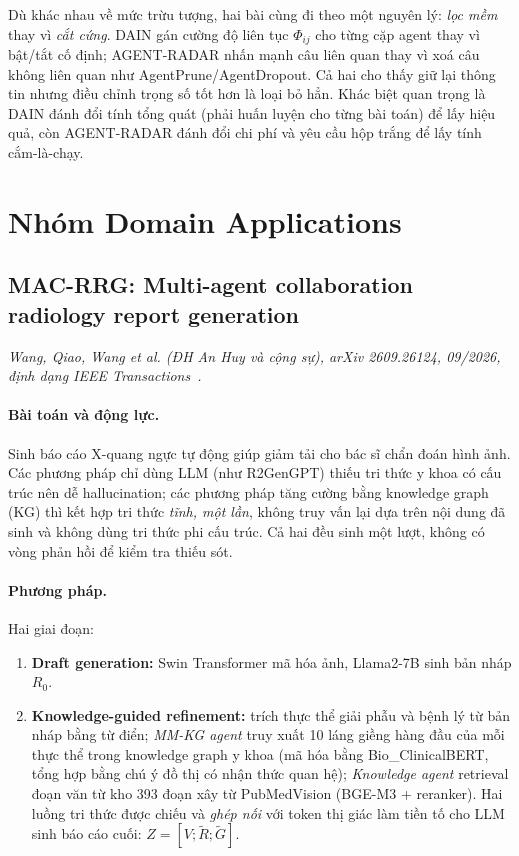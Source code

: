 Dù khác nhau về mức trừu tượng, hai bài cùng đi theo một nguyên lý: \emph{lọc mềm} thay vì \emph{cắt cứng}. DAIN gán cường độ liên tục $\Phi_{ij}$ cho từng cặp agent thay vì bật/tắt cố định; AGENT-RADAR nhấn mạnh câu liên quan thay vì xoá câu không liên quan như AgentPrune/AgentDropout. Cả hai cho thấy giữ lại thông tin nhưng điều chỉnh trọng số tốt hơn là loại bỏ hẳn. Khác biệt quan trọng là DAIN đánh đổi tính tổng quát (phải huấn luyện cho từng bài toán) để lấy hiệu quả, còn AGENT-RADAR đánh đổi chi phí và yêu cầu hộp trắng để lấy tính cắm-là-chạy.

\section{Nhóm Domain Applications}

\subsection{MAC-RRG: Multi-agent collaboration radiology report generation}
\label{sec:macrrg}

\noindent\textit{Wang, Qiao, Wang et al. (ĐH An Huy và cộng sự), arXiv 2609.26124, 09/2026, định dạng IEEE Transactions~\cite{p2macrrg}.}

\paragraph{Bài toán và động lực.} Sinh báo cáo X-quang ngực tự động giúp giảm tải cho bác sĩ chẩn đoán hình ảnh. Các phương pháp chỉ dùng LLM (như R2GenGPT) thiếu tri thức y khoa có cấu trúc nên dễ hallucination; các phương pháp tăng cường bằng knowledge graph (KG) thì kết hợp tri thức \emph{tĩnh, một lần}, không truy vấn lại dựa trên nội dung đã sinh và không dùng tri thức phi cấu trúc. Cả hai đều sinh một lượt, không có vòng phản hồi để kiểm tra thiếu sót.

\paragraph{Phương pháp.} Hai giai đoạn:
\begin{enumerate}
  \item \textbf{Draft generation:} Swin Transformer mã hóa ảnh, Llama2-7B sinh bản nháp $R_0$.
  \item \textbf{Knowledge-guided refinement:} trích thực thể giải phẫu và bệnh lý từ bản nháp bằng từ điển; \emph{MM-KG agent} truy xuất 10 láng giềng hàng đầu của mỗi thực thể trong knowledge graph y khoa (mã hóa bằng Bio\_ClinicalBERT, tổng hợp bằng chú ý đồ thị có nhận thức quan hệ); \emph{Knowledge agent} retrieval đoạn văn từ kho 393 đoạn xây từ PubMedVision (BGE-M3 + reranker). Hai luồng tri thức được chiếu và \emph{ghép nối} với token thị giác làm tiền tố cho LLM sinh báo cáo cuối: $Z = [V; \tilde R; \tilde G]$.
\end{enumerate}

